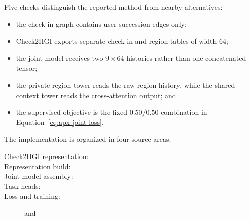 Five checks distinguish the reported method from nearby alternatives:
\begin{itemize}
    \item the check-in graph contains user-succession edges only;
    \item Check2HGI exports separate check-in and region tables of width 64;
    \item the joint model receives two $9\times64$ histories rather than one
    concatenated tensor;
    \item the private region tower reads the raw region history, while the
    shared-context tower reads the cross-attention output; and
    \item the supervised objective is the fixed $0.50/0.50$ combination in
    Equation~\ref{eq:apx-joint-loss}.
\end{itemize}

The implementation is organized in four source areas:
{\small
\begin{description}
    \item[Check2HGI representation:] 
    \item[Representation build:] 
    \item[Joint-model assembly:] 
    \item[Task heads:] 
    \item[Loss and training:]  and 
\end{description}
}
